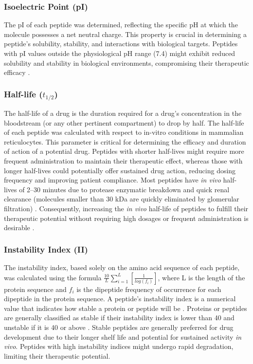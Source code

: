 \vspace{4pt} \noindent
\subsubsection{Isoelectric Point (pI)}
The pI of each peptide was determined, reflecting the specific pH at which the molecule possesses a net neutral charge. This property is crucial in determining a peptide's solubility, stability, and interactions with biological targets. Peptides with pI values outside the physiological pH range (7.4) might exhibit reduced solubility and stability in biological environments, compromising their therapeutic efficacy \cite{frolov2022pichemist}.

\vspace{4pt} \noindent
\subsubsection{Half-life ($t_{1/2}$)}
The half-life of a drug is the duration required for a drug's concentration in the bloodstream (or any other pertinent compartment) to drop by half. The half-life of each peptide was calculated with respect to in-vitro conditions in mammalian reticulocytes. This parameter is critical for determining the efficacy and duration of action of a potential drug. Peptides with shorter half-lives might require more frequent administration to maintain their therapeutic effect, whereas those with longer half-lives could potentially offer sustained drug action, reducing dosing frequency and improving patient compliance. Most peptides have \textit{in vivo} half-lives of 2–30 minutes due to protease enzymatic breakdown and quick renal clearance (molecules smaller than 30 kDa are quickly eliminated by glomerular filtration) \cite{penchala2015biomimetic}. Consequently, increasing the \textit{in vivo} half-life of peptides to fulfill their therapeutic potential without requiring high dosages or frequent administration is desirable \cite{penchala2015biomimetic}. 

\vspace{4pt} \noindent
\subsubsection{Instability Index (II)}
The instability index, based solely on the amino acid sequence of each peptide, was calculated using the formula $\frac{10}{L}\sum_{i=1}^{L} \left[\frac{1}{log(f_i)}\right] $, where L is the length of the protein sequence and $f_i$ is the dipeptide frequency of occurrence for each dipeptide in the protein sequence. A peptide's instability index is a numerical value that indicates how stable a protein or peptide will be \cite{Guruprasad1990}. Proteins or peptides are generally classified as stable if their instability index is lower than 40 and unstable if it is 40 or above \cite{Guruprasad1990}. Stable peptides are generally preferred for drug development due to their longer shelf life and potential for sustained activity \textit{in vivo}. Peptides with high instability indices might undergo rapid degradation, limiting their therapeutic potential.

